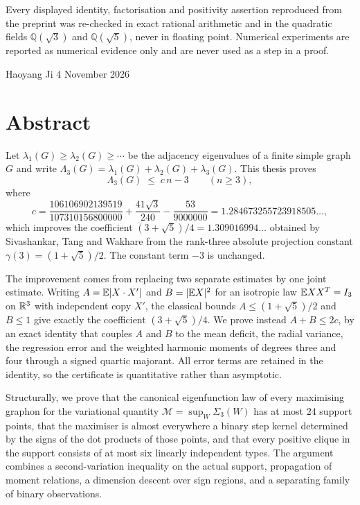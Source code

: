 Every displayed identity, factorisation and positivity assertion reproduced
from the preprint was re-checked in exact rational arithmetic and in the
quadratic fields $\mathbb Q(\sqrt3)$ and $\mathbb Q(\sqrt5)$, never in
floating point. Numerical experiments are reported as numerical evidence
only and are never used as a step in a proof.

\vspace{0.6cm}
\noindent Haoyang Ji \hfill 4 November 2026

\chapter*{Abstract}
Let $\lambda_1(G)\ge\lambda_2(G)\ge\cdots$ be the adjacency eigenvalues of a
finite simple graph $G$ and write
$\Lambda_3(G)=\lambda_1(G)+\lambda_2(G)+\lambda_3(G)$. This thesis proves
\[
 \Lambda_3(G)\;\le\;c\,n-3\qquad(n\ge3),
\]
where
\[
 c=\frac{106106902139519}{107310156800000}+\frac{41\sqrt3}{240}
   -\frac{53}{9000000}=1.284673255723918505\ldots ,
\]
which improves the coefficient $(3+\sqrt5)/4=1.309016994\ldots$ obtained by
Sivashankar, Tang and Wakhare from the rank-three absolute projection
constant $\gamma(3)=(1+\sqrt5)/2$. The constant term $-3$ is unchanged.

The improvement comes from replacing two separate estimates by one joint
estimate. Writing $A=\mathbb E|X\cdot X'|$ and $B=|\mathbb E X|^2$ for an isotropic law
$\mathbb E XX^T=I_3$ on $\mathbb R^3$ with independent copy $X'$, the classical bounds
$A\le(1+\sqrt5)/2$ and $B\le1$ give exactly the coefficient
$(3+\sqrt5)/4$. We prove instead
$A+B\le 2c$, by an exact identity that couples $A$ and $B$ to the mean
deficit, the radial variance, the regression error and the weighted harmonic
moments of degrees three and four through a signed quartic majorant. All
error terms are retained in the identity, so the certificate is quantitative
rather than asymptotic.

Structurally, we prove that the canonical eigenfunction law of every
maximising graphon for the variational quantity
$\mathcal M=\sup_W\Sigma_3(W)$ has at most $24$ support points, that the
maximiser is almost everywhere a binary step kernel determined by the signs
of the dot products of those points, and that every positive clique in the
support consists of at most six linearly independent types. The argument
combines a second-variation inequality on the actual support, propagation of
moment relations, a dimension descent over sign regions, and a separating
family of binary observations.

